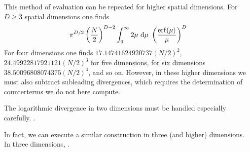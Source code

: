 This method of evaluation can be repeated for higher spatial dimensions.
For $D\geq3$ spatial dimensions one finds
\begin{equation}
    \pi^{D/2} \left(\frac{N}{2}\right)^{D-2} \int_0^\infty 2\mu\ \mathrm{d}\mu\ \left(\frac{\erf(\mu)}{\mu}\right)^D
\end{equation}
For four dimensions one finds $17.14741624920737 (N/2)^2$, $24.49922817921121 (N/2)^3$ for five dimensions, for six dimensions $38.50096808074375 (N/2)^4$, and so on.  However, in these higher dimensions we must also subtract subleading divergences, which requires the determination of counterterms we do not here compute.

The logarithmic divergence in two dimensions must be handled especially carefully.
.

In fact, we can execute a similar construction in three (and higher) dimensions.  In three dimensions, .
